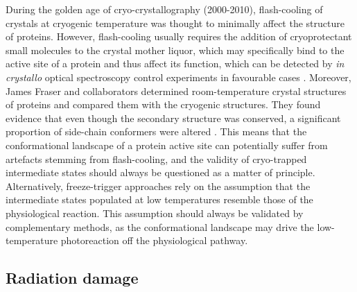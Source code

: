 During the golden age of cryo-crystallography (2000-2010), flash-cooling of crystals at cryogenic temperature was thought to minimally affect the structure of proteins. However, flash-cooling usually requires the addition of cryoprotectant small molecules to the crystal mother liquor, which may specifically bind to the active site of a protein \parencite{bukhdrukerStructuralInsightsEffects2023} and thus affect its function, which can be detected by \textit{in crystallo} optical spectroscopy control experiments in favourable cases \parencite{vonstettenAlterationFluorescentProtein2012}. Moreover, James Fraser and collaborators determined room-temperature crystal structures of proteins and compared them with the cryogenic structures. They found evidence that even though the secondary structure was conserved, a significant proportion of side-chain conformers were altered \parencite{fraserHiddenAlternateStructures2009,fraserAccessingProteinConformational2011}. This means that the conformational landscape of a protein active site can potentially suffer from artefacts stemming from flash-cooling, and the validity of cryo-trapped intermediate states should always be questioned as a matter of principle. Alternatively, freeze-trigger approaches rely on the assumption that the intermediate states populated at low temperatures resemble those of the physiological reaction. This assumption should always be validated by complementary methods, as the conformational landscape may drive the low-temperature photoreaction off the physiological pathway.

\subsection{Radiation damage}\label{sec:raddam}

